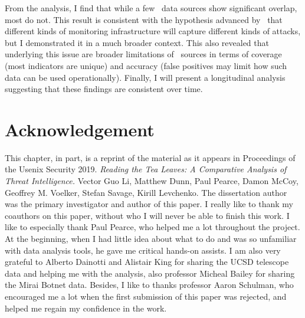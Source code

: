 From the analysis, I find that while a few \ti\ data sources show
significant overlap, most do not.  This result is consistent with the
hypothesis advanced by~\cite{thomas2016abuse} that different kinds of
monitoring infrastructure will capture different kinds of attacks, but
I demonstrated it in a much broader context. This also revealed
that underlying this issue are broader limitations of \ti\ sources in
terms of coverage (most indicators are unique) and accuracy (false
positives may limit how such data can be used operationally).
Finally, I will present a longitudinal analysis suggesting that these
findings are consistent over time.

%







%
%


\section{Acknowledgement}
This chapter, in part, is a reprint of the material 
as it appears in Proceedings of the Usenix Security 2019. \textit{Reading the 
Tea Leaves: A Comparative Analysis of Threat Intelligence.} Vector Guo Li,
Matthew Dunn, Paul Pearce, Damon McCoy, Geoffrey M. Voelker, Stefan Savage,
Kirill Levchenko. The dissertation author was the primary investigator and 
author of this paper. I really like to thank my coauthors on this paper,
without who I will never be able to finish this work. I like to especially 
thank Paul Pearce, who helped me a lot throughout the project. At the
beginning, when I had little idea about what to do and was so unfamiliar with 
data analysis tools, he gave me critical hands-on assists. I am also very
grateful to Alberto Dainotti and Alistair King for sharing the UCSD telescope
data and helping me with the analysis, also professor Micheal Bailey for 
sharing the Mirai Botnet data. Besides, I like to thanks professor Aaron 
Schulman, who encouraged me a lot when the first submission of this paper 
was rejected, and helped me regain my confidence in the work.